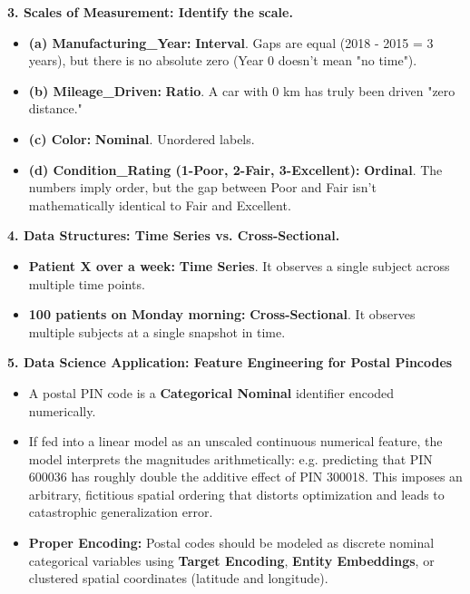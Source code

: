 \textbf{3. Scales of Measurement: Identify the scale.}
\begin{itemize}
    \item \textbf{(a) Manufacturing\_Year:} \textbf{Interval}. Gaps are equal (2018 - 2015 = 3 years), but there is no absolute zero (Year 0 doesn't mean "no time").
    \item \textbf{(b) Mileage\_Driven:} \textbf{Ratio}. A car with 0 km has truly been driven "zero distance."
    \item \textbf{(c) Color:} \textbf{Nominal}. Unordered labels.
    \item \textbf{(d) Condition\_Rating (1-Poor, 2-Fair, 3-Excellent):} \textbf{Ordinal}. The numbers imply order, but the gap between Poor and Fair isn't mathematically identical to Fair and Excellent.
\end{itemize}

\textbf{4. Data Structures: Time Series vs. Cross-Sectional.}
\begin{itemize}
    \item \textbf{Patient X over a week:} \textbf{Time Series}. It observes a single subject across multiple time points.
    \item \textbf{100 patients on Monday morning:} \textbf{Cross-Sectional}. It observes multiple subjects at a single snapshot in time.
\end{itemize}

\textbf{5. Data Science Application: Feature Engineering for Postal Pincodes}
\begin{itemize}
    \item A postal PIN code is a \textbf{Categorical Nominal} identifier encoded numerically.
    \item If fed into a linear model as an unscaled continuous numerical feature, the model interprets the magnitudes arithmetically: e.g. predicting that PIN 600036 has roughly double the additive effect of PIN 300018. This imposes an arbitrary, fictitious spatial ordering that distorts optimization and leads to catastrophic generalization error.
    \item \textbf{Proper Encoding:} Postal codes should be modeled as discrete nominal categorical variables using \textbf{Target Encoding}, \textbf{Entity Embeddings}, or clustered spatial coordinates (latitude and longitude).
\end{itemize}


